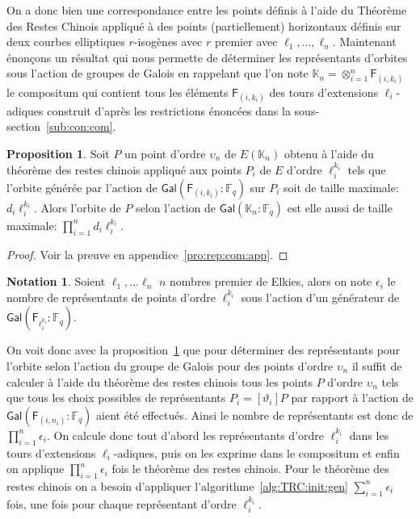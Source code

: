 \documentclass[10pt,a4paper]{book}
\theoremstyle{plain}
\theoremstyle{definition}
\theoremstyle{definition}
\theoremstyle{definition}
\newtheorem{prop}[thm]{Proposition}
\theoremstyle{definition}
\theoremstyle{remark}
\theoremstyle{remark}
\theoremstyle{definition}
\newtheorem{nota}[thm]{Notation}
\begin{document}
On a donc bien une correspondance entre les points définis à l'aide du Théorème
 des Restes Chinois appliqué à des points (partiellement) horizontaux définis 
 sur deux courbes elliptiques $r$-isogènes avec $r$ premier avec $\ell_1, \dots
 , \ell_n$.
 Maintenant énonçons un résultat qui nous permette de déterminer les 
 représentants d'orbites sous l'action de groupes de Galois en rappelant que 
 l'on note $\mathbb{K}_n=\otimes_{i=1}^{n}\mathsf{F}_{(i,k_i)}$ le compositum
 qui contient tous les éléments $\mathsf{F}_{(i,k_i)}$ des tours d'extensions
 $\ell_i$-adiques construit d'après les restrictions énoncées dans la 
 sous-section~\ref{sub:con:com}.
\begin{prop}
\label{pro:rep:com}
Soit $P$ un point d'ordre $\upsilon_n$ de $E(\mathbb{K}_n)$ obtenu à l'aide 
du théorème des restes chinois appliqué aux points $P_i$ de $E$ d'ordre 
$\ell_i^{k_i}$ tels que l'orbite générée par l'action de 
$\mathsf{Gal}(\mathsf{F}_{(i,k_i)}:\mathbb{F}_q)$ sur $P_i$ soit de taille
 maximale: $d_i\ell_i^{k_i}$.  Alors l'orbite de $P$ selon l'action de 
 $\mathsf{Gal}(\mathbb{K}_n:\mathbb{F}_q)$ est elle aussi de taille maximale:
 $\prod_{i=1}^nd_i\ell_i^{k_i}$.
\end{prop} 

\begin{proof} 
Voir la preuve en appendice~\ref{pro:rep:com:app}.
\end{proof}

\begin{nota}
Soient $\ell_1, \dots \ell_n$ $n$ nombres premier de Elkies, alors on note 
$\epsilon_i$ le nombre de représentants de points d'ordre $\ell_i^{k_i}$ sous 
l'action d'un générateur de $\mathsf{Gal}(\mathsf{F}_{\ell_i^{k_i}}:\mathbb{F}_q)$.
\end{nota}

On voit donc avec la proposition~\ref{pro:rep:com} que pour déterminer des 
représentants pour l'orbite selon l'action du groupe de Galois pour des points 
d'ordre $\upsilon_n$ il suffit de calculer à l'aide du théorème des 
restes chinois tous les points $P$ d'ordre $\upsilon_n$ 
tels que tous les choix possibles de représentants $P_i=[\vartheta_i]P$
par rapport à l'action de $\mathsf{Gal}(\mathsf{F}_{(i,n_i)}:\mathbb{F}_q)$
 aient été effectués. Ainsi le nombre de représentants est
 donc de $\prod_{i=1}^{n} \epsilon_i$. On calcule donc 
 tout d'abord les représentants d'ordre $\ell_i^{k_i}$ dans les tours 
 d'extensions $\ell_i$-adiques, puis on les exprime dans le compositum et enfin
 on applique $\prod_{i=1}^{n} \epsilon_i$ fois le théorème des restes chinois. 
 Pour le théorème des restes chinois on a besoin d'appliquer 
 l'algorithme~\ref{alg:TRC:init:gen} $\sum_{i=1}^{n} \epsilon_i$ fois, une fois
 pour chaque représentant d'ordre $\ell_i^{k_i}$.
  
\end{document}

